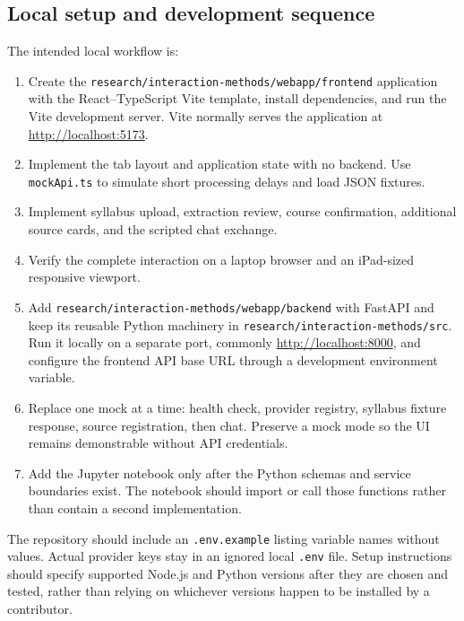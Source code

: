 \documentclass[11pt]{article}
\begin{document}
\subsection{Local setup and development sequence}
The intended local workflow is:
\begin{enumerate}
\item Create the \texttt{research/interaction-methods/webapp/frontend} application with the React--TypeScript Vite template, install dependencies, and run the Vite development server. Vite normally serves the application at \url{http://localhost:5173}.\cite{vite}
\item Implement the tab layout and application state with no backend. Use \texttt{mockApi.ts} to simulate short processing delays and load JSON fixtures.
\item Implement syllabus upload, extraction review, course confirmation, additional source cards, and the scripted chat exchange.
\item Verify the complete interaction on a laptop browser and an iPad-sized responsive viewport.
\item Add \texttt{research/interaction-methods/webapp/backend} with FastAPI and keep its reusable Python machinery in \texttt{research/interaction-methods/src}. Run it locally on a separate port, commonly \url{http://localhost:8000}, and configure the frontend API base URL through a development environment variable.
\item Replace one mock at a time: health check, provider registry, syllabus fixture response, source registration, then chat. Preserve a mock mode so the UI remains demonstrable without API credentials.
\item Add the Jupyter notebook only after the Python schemas and service boundaries exist. The notebook should import or call those functions rather than contain a second implementation.
\end{enumerate}

The repository should include an \texttt{.env.example} listing variable names without values. Actual provider keys stay in an ignored local \texttt{.env} file. Setup instructions should specify supported Node.js and Python versions after they are chosen and tested, rather than relying on whichever versions happen to be installed by a contributor.
\end{document}
